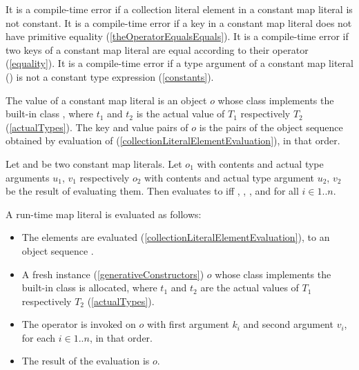 \documentclass[makeidx]{article}
\begin{document}
{\LMHash{}%
It is a compile-time error
if a collection literal element in a constant map literal is not constant.
It is a compile-time error if
a key in a constant map literal
does not have primitive equality
(\ref{theOperatorEqualsEquals}).
It is a compile-time error if two keys of a constant map literal are equal
according to their \lit{==} operator
(\ref{equality}).
It is a compile-time error if a type argument of a constant map literal
()
is not a constant type expression
(\ref{constants}).


\LMHash{}%
The value of a constant map literal
is an object $o$ whose class implements the built-in class
,
where $t_1$ and $t_2$ is the actual value of $T_1$ respectively $T_2$
(\ref{actualTypes}).
The key and value pairs of $o$ is
the pairs of the object sequence  obtained by
evaluation of 
(\ref{collectionLiteralElementEvaluation}),
in that order.

\LMHash{}%
Let 
and 
be two constant map literals.
Let $o_1$ with contents 
and actual type arguments $u_1$, $v_1$
respectively
$o_2$ with contents 
and actual type argument $u_2$, $v_2$
be the result of evaluating them.
Then  evaluates to \TRUE{} if{}f
, ,
, and
for all $i \in 1 .. n$.


\LMHash{}%
A run-time map literal
is evaluated as follows:
\begin{itemize}
\item
  The elements  are evaluated
  (\ref{collectionLiteralElementEvaluation}),
  to an object sequence .
\item
  A fresh instance (\ref{generativeConstructors}) $o$
  whose class implements the built-in class 
  is allocated,
  where $t_1$ and $t_2$ are the actual values of $T_1$ respectively $T_2$
  (\ref{actualTypes}).
\item
  The operator \lit{[]=} is invoked on $o$
  with first argument $k_i$ and second argument $v_i$,
  for each $i \in 1 .. n$, in that order.
\item
  The result of the evaluation is $o$.
\end{itemize}

}
\end{document}
